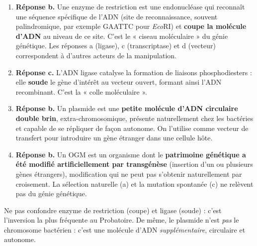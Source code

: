 \documentclass[11pt]{article}
\newcommand{\cle}[1]{{\popxbold\color{popdark}#1}}
\begin{document}
\begin{corrige}
\begin{enumerate}
\item \textbf{Réponse b.} Une enzyme de restriction est une endonucléase qui reconnaît une séquence spécifique de l'ADN (site de reconnaissance, souvent palindromique, par exemple GAATTC pour \emph{Eco}RI) et \textbf{coupe la molécule d'ADN} au niveau de ce site. C'est le « ciseau moléculaire » du génie génétique. Les réponses a (ligase), c (transcriptase) et d (vecteur) correspondent à d'autres acteurs de la manipulation.
\item \textbf{Réponse c.} L'\cle{ADN ligase} catalyse la formation de liaisons phosphodiesters : elle \textbf{soude} le gène d'intérêt au vecteur ouvert, formant ainsi l'ADN recombinant. C'est la « colle moléculaire ».
\item \textbf{Réponse b.} Un plasmide est une \textbf{petite molécule d'ADN circulaire double brin}, extra-chromosomique, présente naturellement chez les bactéries et capable de se répliquer de façon autonome. On l'utilise comme \cle{vecteur de transfert} pour introduire un gène étranger dans une cellule hôte.
\item \textbf{Réponse b.} Un OGM est un organisme dont le \textbf{patrimoine génétique a été modifié artificiellement par transgénèse} (insertion d'un ou plusieurs gènes étrangers), modification qui ne peut pas s'obtenir naturellement par croisement. La sélection naturelle (a) et la mutation spontanée (c) ne relèvent pas du génie génétique.
\end{enumerate}
\begin{attention}
Ne pas confondre enzyme de restriction (coupe) et ligase (soude) : c'est l'inversion la plus fréquente au Probatoire. De même, le plasmide n'est \emph{pas} le chromosome bactérien : c'est une molécule d'ADN \emph{supplémentaire}, circulaire et autonome.
\end{attention}
\end{corrige}
\end{document}
